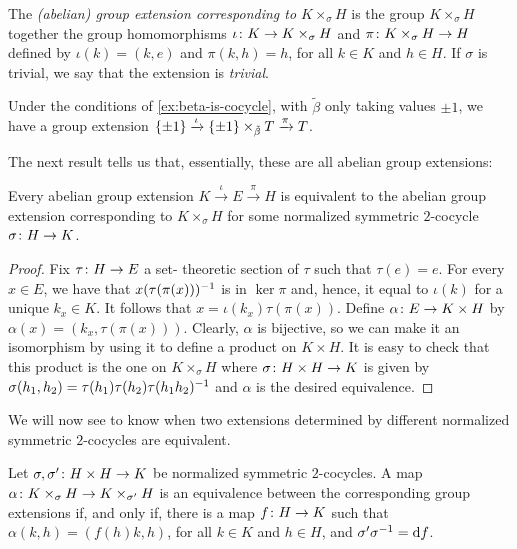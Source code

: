 \begin{defi}
	The \emph{(abelian) group extension corresponding to $K \times_\sigma H$} is the group $K \times_\sigma H$ together the group homomorphisms $\iota \colon K \to K \times_\sigma H$ and $\pi \colon K \times_\sigma H \to H$ defined by $\iota (k) = (k , e)$ and $\pi (k, h) = h$, for all $k\in K$ and $h\in H$.
	If $\sigma$ is trivial, we say that the extension is \emph{trivial}.
\end{defi}

\begin{ex}\label{ex:pmone-x-tilde-beta-T}
    Under the conditions of \cref{ex:beta-is-cocycle}, with $\tilde\beta$ only taking values $\pm 1$, we have a group extension $\{ \pm 1 \} \xrightarrow{\iota} \{ \pm 1 \} \times_{\tilde\beta} T \xrightarrow{\pi} T$. 
\end{ex}

The next result tells us that, essentially, these are all abelian group extensions:

\begin{prop}\label{prop:all-ext-are-cocycle}
	Every abelian group extension $K \xrightarrow{\iota} E \xrightarrow{\pi} H$ is equivalent to the abelian group extension corresponding to $K\times_\sigma H$ for some normalized symmetric $2$-cocycle $\sigma\colon H \to K$.
\end{prop}

\begin{proof}
	Fix $\tau\colon H \to E$ a set- theoretic section of $\tau$ such that $\tau(e) = e$.
	For every $x \in E$, we have that $x (\tau(\pi(x)))^{-1}$ is in $\ker \pi$ and, hence, it equal to $\iota(k)$ for a unique $k_x\in K$.
	It follows that $x = \iota(k_x) \tau(\pi(x))$.
	Define $\alpha\colon E \to K\times H$ by $\alpha(x) = (k_x, \tau(\pi(x)) )$.
	Clearly, $\alpha$ is bijective, so we can make it an isomorphism by using it to define a product on $K\times H$.
	It is easy to check that this product is the one on $K \times_\sigma H$ where $\sigma\colon H\times H \to K$ is given by $\sigma(h_1, h_2) = \tau(h_1) \tau(h_2) \tau(h_1 h_2)^{-1}$ and $\alpha$ is the desired equivalence.
\end{proof}

We will now see to know when two extensions determined by different normalized symmetric $2$-cocycles are equivalent. 

\begin{prop}\label{prop:coboundary}
	Let $\sigma, \sigma' \colon H\times H \to K$ be normalized symmetric $2$-cocycles.
	A map $\alpha\colon K \times_{\sigma} H \to K \times_{\sigma'} H$ is an equivalence between the corresponding group extensions if, and only if, there is a map $f\colon H \to K$ such that $\alpha(k,h) = (f(h) k, h)$, for all $k\in K$ and $h\in H$, and $\sigma' \sigma^{-1} = \mathrm{d} f$.
\end{prop}

